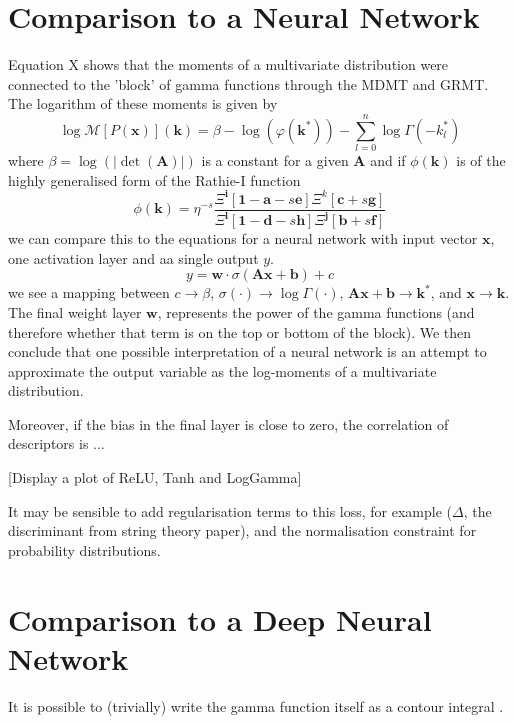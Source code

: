\documentclass[journal=jcisd8,manuscript=article,layout=onecolumn,pdftex,floatfix,amsmath,amssymb,10pt]{achemso}
\begin{document}
\section{Comparison to a Neural Network}
Equation X shows that the moments of a multivariate distribution were connected to the 'block' of gamma functions through the MDMT and GRMT. The logarithm of these moments is given by
\begin{equation}
\log \mathcal{M}[P(\mathbf{x})](\mathbf{k}) = \beta - \log(\varphi(\mathbf{k}^*)) - \sum_{l=0}^n \log\Gamma(-k_l^*)
\end{equation}
where $\beta = \log(|\det(\mathbf{A})|)$ is a constant for a given $\mathbf{A}$ and if $\phi(\mathbf{k})$ is of the highly generalised form of the Rathie-I function
\begin{equation}
\phi(\mathbf{k}) =  \eta^{-s}\frac{\Xi^{\mathbf{i}}[\mathbf{1-a}-s\mathbf{e}]\Xi^{k}[\mathbf{c}+s\mathbf{g}]}{\Xi^{\mathbf{l}}[\mathbf{1-d}-s\mathbf{h}] \Xi^{\mathbf{j}}[\mathbf{b} + s \mathbf{f}]}
\end{equation}
we can compare this to the equations for a neural network with input vector $\mathbf{x}$, one activation layer and aa single output $y$.
\begin{equation}
y = \mathbf{w}\cdot\sigma(\mathbf{Ax} + \mathbf{b}) + c
\end{equation}
we see a mapping between $c \to \beta$, $\sigma(\cdot) \to \log\Gamma(\cdot)$, $\mathbf{Ax + b} \to \mathbf{k}^*$, and $\mathbf{x} \to \mathbf{k}$. The final weight layer $\mathbf{w}$, represents the power of the gamma functions (and therefore whether that term is on the top or bottom of the block). We then conclude that one possible interpretation of a neural network is an attempt to approximate the output variable as the log-moments of a multivariate distribution.

Moreover, if the bias in the final layer is close to zero, the correlation of descriptors is ...

[Display a plot of ReLU, Tanh and LogGamma]

It may be sensible to add regularisation terms to this loss, for example ({\color{red}$\Delta$, the discriminant from string theory paper}), and the normalisation constraint for probability distributions.

\section{Comparison to a Deep Neural Network}
It is possible to (trivially) write the gamma function itself as a contour integral \citep{Rathie2013}. 
\end{document}
